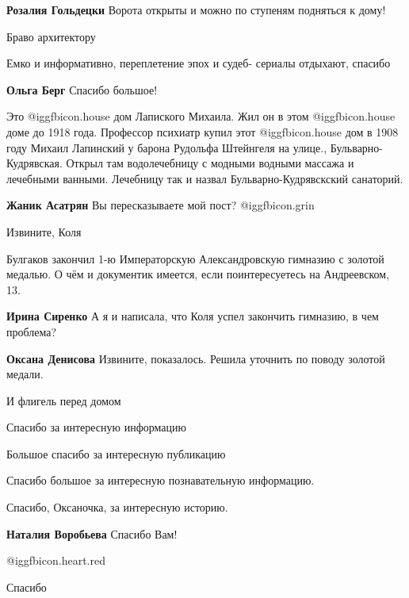 \begin{itemize}
\textbf{Розалия Гольдецки} Ворота открыты и можно по ступеням подняться к дому!

Браво архитектору

Емко и информативно, переплетение эпох и судеб- сериалы отдыхают, спасибо

\textbf{Ольга Берг} Спасибо большое!


Это  @igg{fbicon.house}  дом Лапиского Михаила. Жил он в этом
@igg{fbicon.house}  доме до 1918 года. Профессор психиатр купил этот
@igg{fbicon.house}  дом в 1908 году Михаил Лапинский у барона Рудольфа
Штейнгеля на улице., Бульварно-Кудрявская. Открыл там водолечебницу с модными
водными массажа и лечебными ванными. Лечебницу так и назвал
Бульварно-Кудрявскский санаторий.

\textbf{Жаник Асатрян} Вы пересказываете мой пост? @igg{fbicon.grin} 

Извините, Коля

Булгаков закончил 1-ю Императорскую Александровскую гимназию с золотой медалью.
О чём и документик имеется, если поинтересуетесь на Андреевском, 13.

\begin{itemize} %
\textbf{Ирина Сиренко} А я и написала, что Коля успел закончить гимназию, в чем проблема?

\textbf{Оксана Денисова} Извините, показалось. Решила уточнить по поводу золотой медали.
\end{itemize} %

И флигель перед домом

Спасибо за интересную информацию

Большое спасибо за интересную публикацию

Спасибо большое за интересную познавательную информацию.

Спасибо, Оксаночка, за интересную историю.

\textbf{Наталия Воробьева} Спасибо Вам!

@igg{fbicon.heart.red}

Спасибо



\end{itemize}
